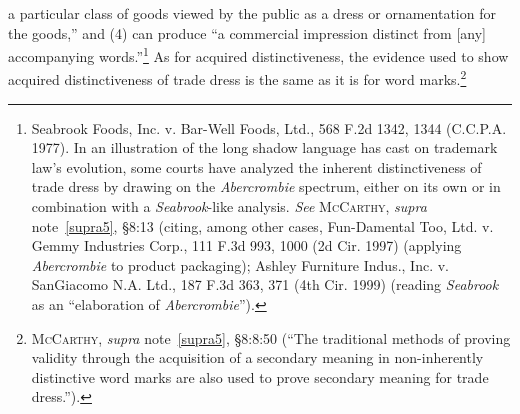 \documentclass[letterpaper, 11pt, oneside]{article}
\begin{document}
a particular class of goods viewed by the public as a dress or ornamentation for the goods,'' and (4) can produce ``a commercial impression distinct from [any] accompanying words.''\footnote{Seabrook Foods, Inc. v. Bar-Well Foods, Ltd., 568 F.2d 1342, 1344 (C.C.P.A. 1977). In an illustration of the long shadow language has cast on trademark law's evolution, some courts have analyzed the inherent distinctiveness of trade dress by drawing on the \textit{Abercrombie} spectrum, either on its own or in combination with a \textit{Seabrook}-like analysis. \textit{See} \textsc{McCarthy}, \textit{supra} note~\ref{supra5}, \S 8:13 (citing, among other cases, Fun-Damental Too, Ltd. v. Gemmy Industries Corp., 111 F.3d 993, 1000 (2d Cir. 1997) (applying \textit{Abercrombie} to product packaging); Ashley Furniture Indus., Inc. v. SanGiacomo N.A. Ltd., 187 F.3d 363, 371 (4th Cir. 1999) (reading \textit{Seabrook} as an ``elaboration of \textit{Abercrombie}'').} As for acquired distinctiveness, the evidence used to show acquired distinctiveness of trade dress is the same as it is for word marks.\footnote{\textsc{McCarthy}, \textit{supra} note~\ref{supra5}, \S 8:8:50 (``The traditional methods of proving validity through the acquisition of a secondary meaning in non-inherently distinctive word marks are also used to prove secondary meaning for trade dress.'').}
\end{document}
